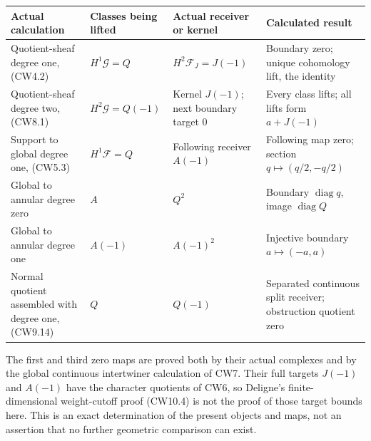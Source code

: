 {\def\LTcaptype{none} %
\begin{longtable}[]{@{}
  >{\raggedright\arraybackslash}p{}
  >{\raggedright\arraybackslash}p{}
  >{\raggedright\arraybackslash}p{}
  >{\raggedright\arraybackslash}p{}@{}}
\toprule\noalign{}
\begin{minipage}[b]{\linewidth}\raggedright
Actual calculation
\end{minipage} & \begin{minipage}[b]{\linewidth}\raggedright
Classes being lifted
\end{minipage} & \begin{minipage}[b]{\linewidth}\raggedright
Actual receiver or kernel
\end{minipage} & \begin{minipage}[b]{\linewidth}\raggedright
Calculated result
\end{minipage} \\
\midrule\noalign{}
\endhead
\bottomrule\noalign{}
\endlastfoot
Quotient-sheaf degree one, (CW4.2) & \(H^1\mathscr G=Q\) &
\(H^2\mathscr F_J=J(-1)\) & Boundary zero; unique cohomology lift, the
identity \\
Quotient-sheaf degree two, (CW8.1) & \(H^2\mathscr G=Q(-1)\) & Kernel
\(J(-1)\); next boundary target \(0\) & Every class lifts; all lifts
form \(a+J(-1)\) \\
Support to global degree one, (CW5.3) & \(H^1\mathscr F=Q\) & Following
receiver \(A(-1)\) & Following map zero; section
\(q\mapsto(q/2,-q/2)\) \\
Global to annular degree zero & \(A\) & \(Q^2\) & Boundary
\(\operatorname{diag}q\), image \(\operatorname{diag}Q\) \\
Global to annular degree one & \(A(-1)\) & \(A(-1)^2\) & Injective
boundary \(a\mapsto(-a,a)\) \\
Normal quotient assembled with degree one, (CW9.14) & \(Q\) & \(Q(-1)\)
& Separated continuous split receiver; obstruction quotient zero \\
\end{longtable}
}

The first and third zero maps are proved both by their actual complexes
and by the global continuous intertwiner calculation of CW7. Their full
targets \(J(-1)\) and \(A(-1)\) have the character quotients of CW6, so
Deligne's finite-dimensional weight-cutoff proof (CW10.4) is not the
proof of those target bounds here. This is an exact determination of the
present objects and maps, not an assertion that no further geometric
comparison can exist.

